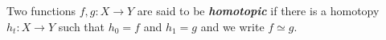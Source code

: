 \documentclass[preview]{standalone}
\begin{document}
\begin{center}
Two functions $f,g : X\to Y$ are said to be \textbf{\textit{homotopic}} if there is a homotopy $h_t : X\to Y$ such that $h_0=f$ and $h_1=g$ and we write $f\simeq g$.
\end{center}
\end{document}

